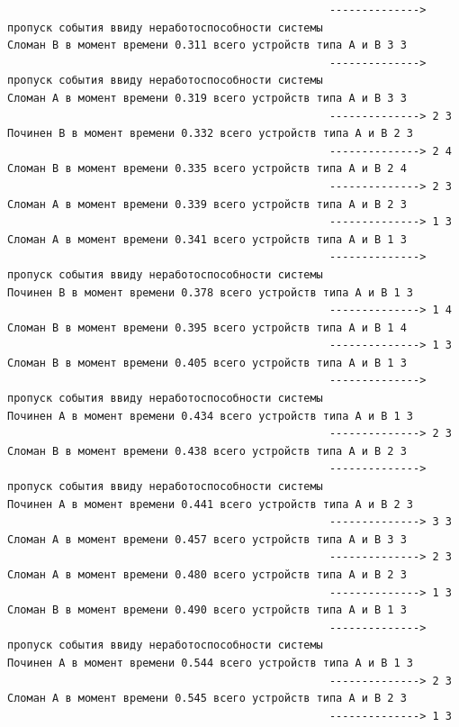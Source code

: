 \begin{verbatim}
                                                  --------------> пропуск события ввиду неработоспособности системы
Сломан B в момент времени 0.311 всего устройств типа А и В 3 3
                                                  --------------> пропуск события ввиду неработоспособности системы
Сломан A в момент времени 0.319 всего устройств типа А и В 3 3
                                                  --------------> 2 3
Починен B в момент времени 0.332 всего устройств типа А и В 2 3
                                                  --------------> 2 4
Сломан B в момент времени 0.335 всего устройств типа А и В 2 4
                                                  --------------> 2 3
Сломан A в момент времени 0.339 всего устройств типа А и В 2 3
                                                  --------------> 1 3
Сломан A в момент времени 0.341 всего устройств типа А и В 1 3
                                                  --------------> пропуск события ввиду неработоспособности системы
Починен B в момент времени 0.378 всего устройств типа А и В 1 3
                                                  --------------> 1 4
Сломан B в момент времени 0.395 всего устройств типа А и В 1 4
                                                  --------------> 1 3
Сломан B в момент времени 0.405 всего устройств типа А и В 1 3
                                                  --------------> пропуск события ввиду неработоспособности системы
Починен A в момент времени 0.434 всего устройств типа А и В 1 3
                                                  --------------> 2 3
Сломан B в момент времени 0.438 всего устройств типа А и В 2 3
                                                  --------------> пропуск события ввиду неработоспособности системы
Починен A в момент времени 0.441 всего устройств типа А и В 2 3
                                                  --------------> 3 3
Сломан A в момент времени 0.457 всего устройств типа А и В 3 3
                                                  --------------> 2 3
Сломан A в момент времени 0.480 всего устройств типа А и В 2 3
                                                  --------------> 1 3
Сломан B в момент времени 0.490 всего устройств типа А и В 1 3
                                                  --------------> пропуск события ввиду неработоспособности системы
Починен A в момент времени 0.544 всего устройств типа А и В 1 3
                                                  --------------> 2 3
Сломан A в момент времени 0.545 всего устройств типа А и В 2 3
                                                  --------------> 1 3

\end{verbatim}
